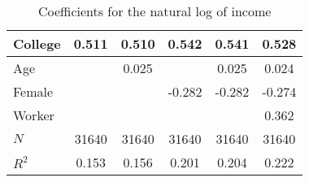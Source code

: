 \begin{table}
\caption{Coefficients for the natural log of income}
\begin{center}
\begin{tabular}{l*{5}{c}}
\hline\hline
\hline
College   &       0.511&       0.510&       0.542&       0.541&       0.528\\
\hline
Age         &            &      0.025&            &      0.025&      0.024\\
\hline
Female         &            &            &      -0.282&      -0.282&      -0.274\\
 \hline
Worker     &            &            &            &            &       0.362\\


\hline
\(N\)       &       31640&       31640&       31640&       31640&       31640\\
 \(R^{2}\)&       0.153&       0.156&       0.201&       0.204&       0.222\\
\hline\hline
\end{tabular}
\end{center}
\end{table}
